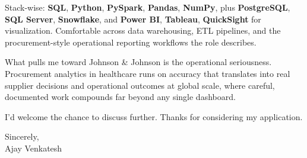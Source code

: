 \documentclass[letterpaper,11pt]{article}
\begin{document}
Stack-wise: \textbf{SQL}, \textbf{Python}, \textbf{PySpark}, \textbf{Pandas}, \textbf{NumPy}, plus \textbf{PostgreSQL}, \textbf{SQL Server}, \textbf{Snowflake}, and \textbf{Power BI}, \textbf{Tableau}, \textbf{QuickSight} for visualization. Comfortable across data warehousing, ETL pipelines, and the procurement-style operational reporting workflows the role describes.

What pulls me toward Johnson \& Johnson is the operational seriousness. Procurement analytics in healthcare runs on accuracy that translates into real supplier decisions and operational outcomes at global scale, where careful, documented work compounds far beyond any single dashboard.

I'd welcome the chance to discuss further. Thanks for considering my application.

\vspace{12pt}
Sincerely, \\
Ajay Venkatesh
\end{document}
